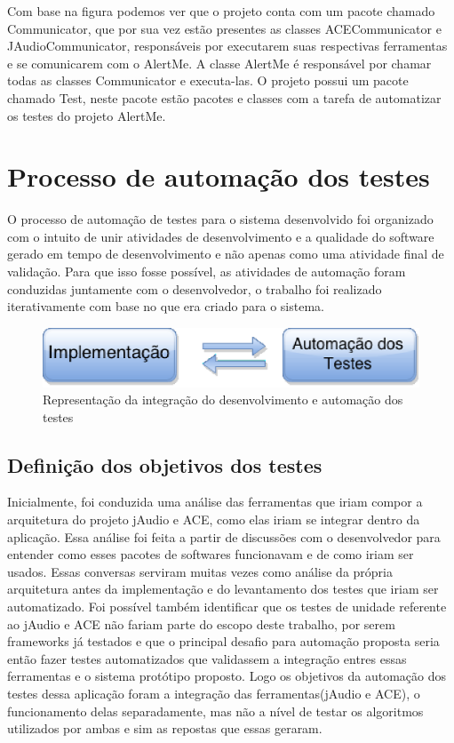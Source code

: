 Com base na figura podemos ver que o projeto conta com um pacote chamado Communicator, que por sua vez estão presentes as classes ACECommunicator e JAudioCommunicator, responsáveis por executarem suas respectivas ferramentas e se comunicarem com o AlertMe. A classe AlertMe é responsável por chamar todas as classes Communicator e executa-las. O projeto possui um pacote chamado Test, neste pacote estão pacotes e classes com a tarefa de automatizar os testes do projeto AlertMe. 

\section{Processo de automação dos testes}

O processo de automação de testes para o sistema desenvolvido foi organizado com o intuito de unir atividades de desenvolvimento e a qualidade do software gerado em tempo de desenvolvimento e não apenas como uma atividade final de validação. Para que isso fosse possível, as atividades de automação foram conduzidas juntamente com o desenvolvedor, o trabalho foi realizado iterativamente com base no que era criado para o sistema.

\begin{figure}[H]
	\centering
	\captionsetup{justification=centering,margin=2cm}
	\includegraphics[scale=0.80]{capitulos/validacao/figuras/automationTestProcess.eps}
	\caption{Representação da integração do desenvolvimento e automação dos testes}
	\label{fig:result-engajamento}
\end{figure}

\subsection{Definição dos objetivos dos testes}

Inicialmente, foi conduzida uma análise das ferramentas que iriam compor a arquitetura do projeto jAudio e ACE, como elas iriam se integrar dentro da aplicação. Essa análise foi feita a partir de discussões com o desenvolvedor para entender como esses pacotes de softwares funcionavam e de como iriam ser usados. Essas conversas serviram muitas vezes como análise da própria arquitetura antes da implementação e do levantamento dos testes que iriam ser automatizado. Foi possível também identificar que os testes de unidade referente ao jAudio e ACE não fariam parte do escopo deste trabalho, por serem frameworks já testados e que o principal desafio para automação proposta seria então fazer testes automatizados que validassem a integração entres essas ferramentas e o sistema protótipo proposto. Logo os objetivos da automação dos testes dessa aplicação foram a integração das ferramentas(jAudio e ACE), o funcionamento delas separadamente, mas não a nível de testar os algoritmos utilizados por ambas e sim as repostas que essas geraram.

